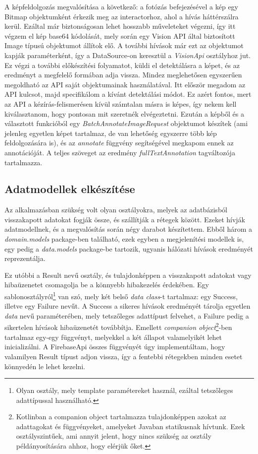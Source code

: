 A képfeldolgozás megvalósítása a következő: a fotózás befejezésével a kép egy Bitmap objektumként érkezik meg az interactorhoz, ahol a hívás háttérszálra kerül. Ezáltal már biztonságosan lehet hosszabb műveleteket végezni, így itt végzem el kép base64 kódolását, mely során egy Vision API által biztosított Image típusú objektumot állítok elő. A további hívások már ezt az objektumot kapják paraméterként, így a DataSource-on keresztül a \emph{VisionApi} osztályhoz jut. Ez végzi a további előkészítési folyamatot, küldi el detektálásra a képet, és az eredményt a megfelelő formában adja vissza. Mindez meglehetősen egyszerűen megoldható az API saját objektumainak használatával. Itt először megadom az API kulcsot, majd specifikálom a kívánt detektálási módot. Ez azért fontos, mert az API a kézírás-felismerésen kívül számtalan másra is képes, így nekem kell kiválasztanom, hogy pontosan mit szeretnék elvégeztetni. Ezután a képből és a választott funkcióból egy \emph{BatchAnnotateImageRequest} objektumot készítek (ami jelenleg egyetlen képet tartalmaz, de van lehetőség egyszerre több kép feldolgozására is), és az \emph{annotate} függvény segítségével megkapom ennek az annotációját. A teljes szöveget az eredmény \emph{fullTextAnnotation} tagváltozója tartalmazza.

\subsection{Adatmodellek elkészítése}
Az alkalmazásban szükség volt olyan osztályokra, melyek az adatbázisból visszakapott adatokat fogják össze, és szállítják a rétegek között. Ezeket hívják adatmodellnek, és a megvalósítás során négy darabot készítettem. Ebből három a \emph{domain.models} package-ben található, ezek egyben a megjelenítési modellek is, egy pedig a \emph{data.models} package-be tartozik, ugyanis hálózati hívások eredményét reprezentálja.

Ez utóbbi a Result nevű osztály, és tulajdonképpen a visszakapott adatokat vagy hibaüzenetet csomagolja be a könnyebb hibakezelés érdekében. Egy sablonosztályról\footnote{Olyan osztály, mely template paramétereket használ, ezáltal tetszőleges adattípussal használható.} van szó, mely két belső \emph{data class}-t tartalmaz: egy Success, illetve egy Failure nevűt. A Success a sikeres hívások eredményét tárolja egyetlen \emph{data} nevű paraméterében, mely tetszőleges adattípust felvehet, a Failure pedig a sikertelen hívások hibaüzenetét továbbítja. Emellett \emph{companion object}\footnote{Kotlinban a companion object tartalmazza tulajdonképpen azokat az adattagokat és függvényeket, amelyeket Javaban statikusnak hívtunk. Ezek osztályszintűek, ami annyit jelent, hogy nincs szükség az osztály példányosítására ahhoz, hogy elérjük őket.}-ben tartalmaz egy-egy függvényt, melyekkel a két állapot valamelyikét lehet inicializálni. A FirebaseApi összes függvényét úgy implementáltam, hogy valamilyen Result típust adjon vissza, így a fentebbi rétegekben minden esetet könnyedén le lehet kezelni.

